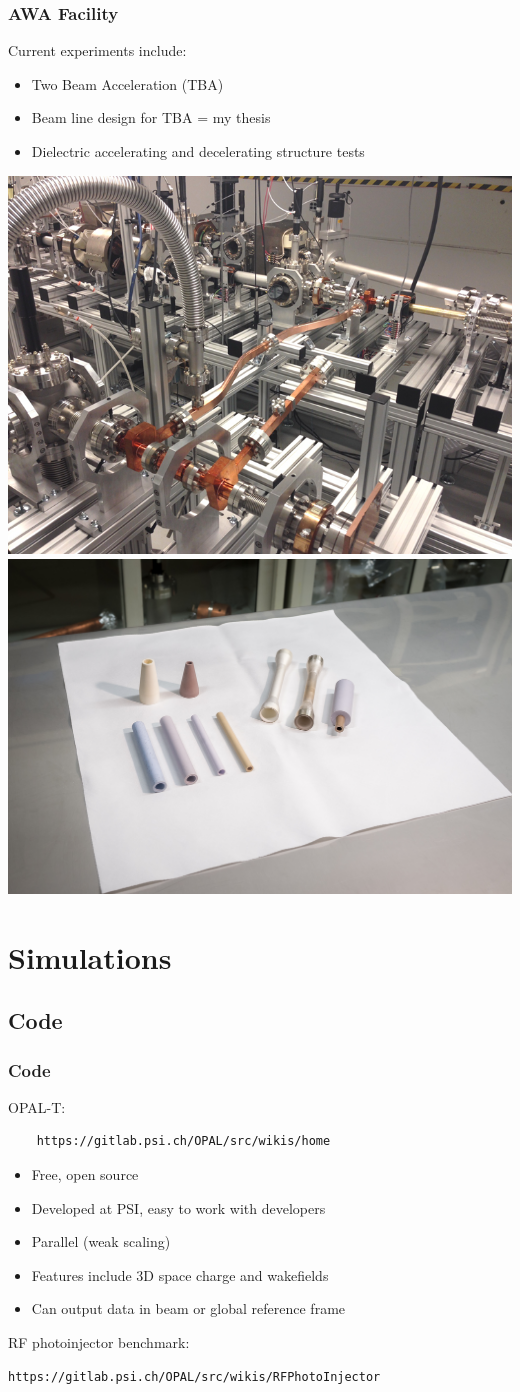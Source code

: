 \documentclass[professionalfonts,t]{beamer}
\begin{document}
\begin{frame}[t]
	\frametitle{AWA Facility}
	Current experiments include:
	\begin{itemize}
		\item{Two Beam Acceleration (TBA)}
		\item{Beam line design for TBA = my thesis}
		\item{Dielectric accelerating and decelerating structure tests}	
	\end{itemize}
    \vspace{1em}
	\includegraphics[width=0.5\linewidth, trim={0 0 0 1.65cm},clip]{../images/stage}\hfill%
	\includegraphics[width=0.5\linewidth]{../images/dielectrics}	
\end{frame}
\section{Simulations}
\subsection{Code}
\begin{frame}[containsverbatim]
\frametitle{Code}
OPAL-T: \begin{verbatim}
	https://gitlab.psi.ch/OPAL/src/wikis/home
\end{verbatim}
\begin{itemize}
\item Free, open source 
\item Developed at PSI, easy to work with developers
\item Parallel (weak scaling)
\item Features include 3D space charge and wakefields
\item Can output data in beam or global reference frame
\end{itemize}
RF photoinjector benchmark:
\begin{verbatim}
https://gitlab.psi.ch/OPAL/src/wikis/RFPhotoInjector
\end{verbatim}
\end{frame}
\end{document}
